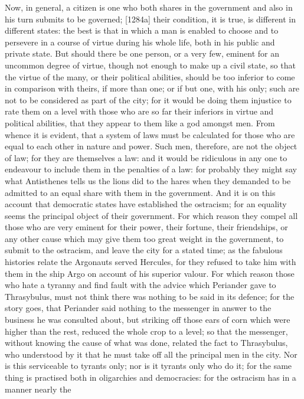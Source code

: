 Now, in general, a citizen is one who both shares in the government and
also in his turn submits to be governed; [1284a] their condition, it is
true, is different in different states: the best is that in which a man is
enabled to choose and to persevere in a course of virtue during his whole
life, both in his public and private state. But should there be one
person, or a very few, eminent for an uncommon degree of virtue, though
not enough to make up a civil state, so that the virtue of the many, or
their political abilities, should be too inferior to come in comparison
with theirs, if more than one; or if but one, with his only; such are not
to be considered as part of the city; for it would be doing them injustice
to rate them on a level with those who are so far their inferiors in
virtue and political abilities, that they appear to them like a god
amongst men. From whence it is evident, that a system of laws must be
calculated for those who are equal to each other in nature and power. Such
men, therefore, are not the object of law; for they are themselves a law:
and it would be ridiculous in any one to endeavour to include them in the
penalties of a law: for probably they might say what Antisthenes tells us
the lions did to the hares when they demanded to be admitted to an equal
share with them in the government. And it is on this account that
democratic states have established the ostracism; for an equality seems
the principal object of their government. For which reason they compel all
those who are very eminent for their power, their fortune, their
friendships, or any other cause which may give them too great weight in
the government, to submit to the ostracism, and leave the city for a
stated time; as the fabulous histories relate the Argonauts served
Hercules, for they refused to take him with them in the ship Argo on
account of his superior valour. For which reason those who hate a tyranny
and find fault with the advice which Periander gave to Thrasybulus, must
not think there was nothing to be said in its defence; for the story goes,
that Periander said nothing to the messenger in answer to the business he
was consulted about, but striking off those ears of corn which were higher
than the rest, reduced the whole crop to a level; so that the messenger,
without knowing the cause of what was done, related the fact to
Thrasybulus, who understood by it that he must take off all the principal
men in the city. Nor is this serviceable to tyrants only; nor is it
tyrants only who do it; for the same thing is practised both in
oligarchies and democracies: for the ostracism has in a manner nearly the
